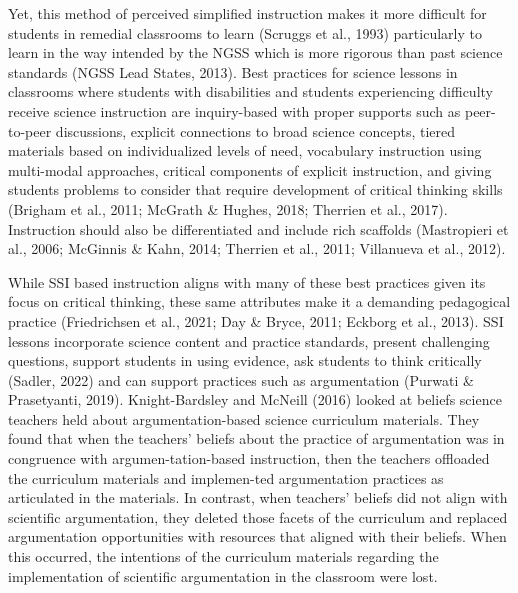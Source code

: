 \documentclass[11.5pt]{sig-alternate}
\begin{document}
\begin{large}
Yet, this method of perceived simplified instruction makes it more difficult for students in remedial classrooms to learn (Scruggs et al., 1993) particularly to learn in the way intended by the NGSS which is more rigorous than past science standards (NGSS Lead States, 2013). Best practices for science lessons in classrooms where students with disabilities and students experiencing difficulty receive science instruction are inquiry-based with proper supports such as peer-to-peer discussions, explicit connections to broad science concepts, tiered materials based on individualized levels of need, vocabulary instruction using multi-modal approaches, critical components of explicit instruction, and giving students problems to consider that require development of critical thinking skills (Brigham et al., 2011; McGrath \& Hughes, 2018; Therrien et al., 2017). Instruction should also be differentiated and include rich scaffolds (Mastropieri et al., 2006; McGinnis \& Kahn, 2014; Therrien et al., 2011; Villanueva et al., 2012).

While SSI based instruction aligns with many of these best practices given its focus on critical thinking, these same attributes make it a demanding pedagogical practice (Friedrichsen et al., 2021; Day \& Bryce, 2011; Eckborg et al., 2013). SSI lessons incorporate science content and practice standards, present challenging questions, support students in using evidence, ask students to think critically (Sadler, 2022) and can support practices such as argumentation (Purwati \& Prasetyanti, 2019). Knight-Bardsley and McNeill (2016) looked at beliefs science teachers held about argumentation-based science curriculum materials. They found that when the teachers’ beliefs about the practice of argumentation was in congruence with argumen-tation-based instruction, then the teachers offloaded the curriculum materials and implemen-ted argumentation practices as articulated in the materials. In contrast, when teachers’ beliefs did not align with scientific argumentation, they deleted those facets of the curriculum and replaced argumentation opportunities with resources that aligned with their beliefs. When this occurred, the intentions of the curriculum materials regarding the implementation of scientific argumentation in the classroom were lost.


\end{large}
\end{document}
